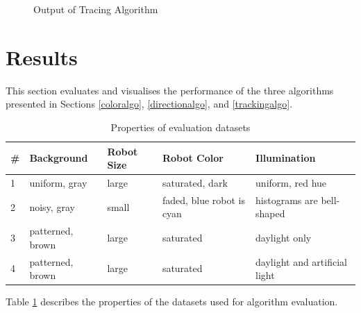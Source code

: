 \documentclass[10pt,a4paper]{article}
\begin{document}
\begin{figure}[ht]
    \begin{center}
    \end{center}
    \caption{Output of Tracing Algorithm}
    \label{trackingfig}
\end{figure}


\section{Results}\label{results}
This section evaluates and visualises the performance of the three algorithms 
presented in Sections \ref{coloralgo}, \ref{directionalgo}, and 
\ref{trackingalgo}. \\
\begin{table}[ht]
\begin{tabular}{|l || l | l | p{2cm} | p{4cm}|}
\hline
\# & Background & Robot Size & Robot Color & Illumination \\
\hline
1 & uniform, gray & large & saturated, dark & uniform, red hue \\
\hline
2 & noisy, gray & small & faded, blue robot is cyan & 
    histograms are bell-shaped \\
\hline
3 & patterned, brown & large & saturated & daylight only \\
\hline
4 & patterned, brown & large & saturated & daylight and artificial 
    light \\
\hline
\end{tabular}
\caption{Properties of evaluation datasets}
\label{datasetpropstable}
\end{table}
Table \ref{datasetpropstable} describes the properties of 
the datasets used for algorithm evaluation.
\end{document}
